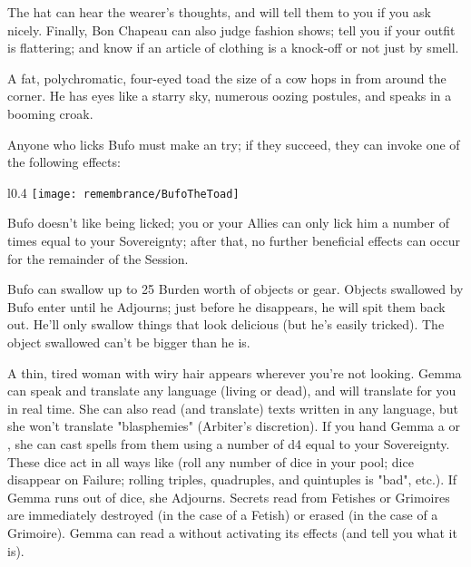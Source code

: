The hat can hear the wearer's thoughts, and will tell them to you if you ask nicely.   Finally, Bon Chapeau can also judge fashion shows; tell you if your outfit is flattering; and know if an article of clothing is a knock-off or not just by smell.



A fat, polychromatic, four-eyed toad the size of a cow hops in from around the corner. He has eyes like a starry sky, numerous oozing postules, and speaks in a booming croak.

Anyone who licks Bufo must make an  try; if they succeed, they can invoke one of the following effects:


\begin{wrapfigure}[11]{l}{0.4\textwidth}
    \texttt{[image: remembrance/BufoTheToad]}
\end{wrapfigure}



Bufo doesn't like being licked; you or your Allies can only lick him a number of times equal to your Sovereignty; after that, no further beneficial effects can occur for the remainder of the Session.



Bufo can swallow up to 25 Burden worth of objects or gear. Objects swallowed by Bufo enter  until he Adjourns; just before he disappears, he will spit them back out.  He'll only swallow things that look delicious (but he's easily tricked).  The object swallowed can't be bigger than he is.



A thin, tired woman with wiry hair appears wherever you're not looking. Gemma can speak and translate any language (living or dead), and will translate for you in real time. She can also read (and translate) texts written in any language, but she won't translate "blasphemies" (Arbiter's discretion). If you hand Gemma a  or , she can cast spells from them using a number of d4 equal to your Sovereignty. These dice act in all ways like  (roll any number of dice in your pool; dice disappear on Failure; rolling triples, quadruples, and quintuples is "bad", etc.). If Gemma runs out of dice, she Adjourns. Secrets read from Fetishes or Grimoires are immediately destroyed (in the case of a Fetish) or erased (in the case of a Grimoire). Gemma can read a  without activating its effects (and tell you what it is).


